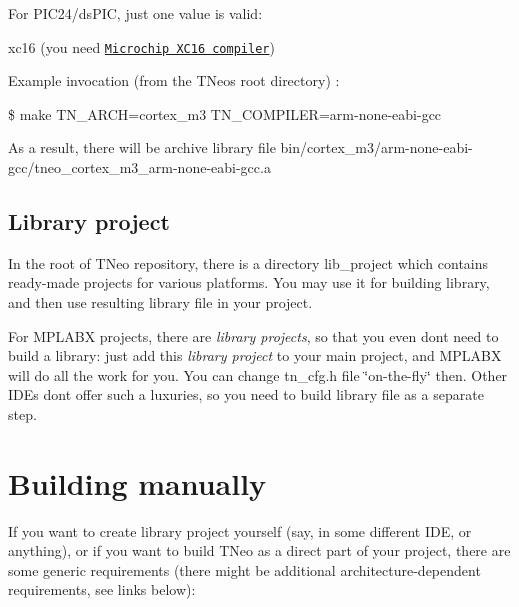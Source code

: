 For P\+I\+C24/ds\+P\+IC, just one value is valid\+:


\begin{DoxyItemize}
\item {\ttfamily xc16} (you need \href{http://www.microchip.com/xc16}{\tt Microchip X\+C16 compiler})
\end{DoxyItemize}

Example invocation (from the T\+Neo\textquotesingle{}s root directory) \+:

{\ttfamily \$ make T\+N\+\_\+\+A\+R\+CH=cortex\+\_\+m3 T\+N\+\_\+\+C\+O\+M\+P\+I\+L\+ER=arm-\/none-\/eabi-\/gcc}

As a result, there will be archive library file {\ttfamily bin/cortex\+\_\+m3/arm-\/none-\/eabi-\/gcc/tneo\+\_\+cortex\+\_\+m3\+\_\+arm-\/none-\/eabi-\/gcc.\+a}\hypertarget{building_building_generic__lib_project}{}\subsection{Library project}\label{building_building_generic__lib_project}
In the root of T\+Neo repository, there is a directory {\ttfamily lib\+\_\+project} which contains ready-\/made projects for various platforms. You may use it for building library, and then use resulting library file in your project.

For M\+P\+L\+A\+BX projects, there are {\itshape library projects}, so that you even don\textquotesingle{}t need to build a library\+: just add this {\itshape library project} to your main project, and M\+P\+L\+A\+BX will do all the work for you. You can change {\ttfamily tn\+\_\+cfg.\+h} file \char`\"{}on-\/the-\/fly\char`\"{} then. Other I\+D\+Es don\textquotesingle{}t offer such a luxuries, so you need to build library file as a separate step.\hypertarget{building_building_generic__manual}{}\section{Building manually}\label{building_building_generic__manual}
If you want to create library project yourself (say, in some different I\+DE, or anything), or if you want to build T\+Neo as a direct part of your project, there are some generic requirements (there might be additional architecture-\/dependent requirements, see links below)\+:


